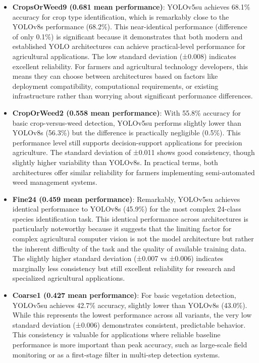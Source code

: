 \begin{itemize}
    \item \textbf{CropsOrWeed9 (0.681 mean performance)}: YOLOv5su achieves 68.1\% accuracy for crop type identification, which is remarkably close to the YOLOv8s performance (68.2\%). This near-identical performance (difference of only 0.1\%) is significant because it demonstrates that both modern and established YOLO architectures can achieve practical-level performance for agricultural applications. The low standard deviation (±0.008) indicates excellent reliability. For farmers and agricultural technology developers, this means they can choose between architectures based on factors like deployment compatibility, computational requirements, or existing infrastructure rather than worrying about significant performance differences.
    
    \item \textbf{CropOrWeed2 (0.558 mean performance)}: With 55.8\% accuracy for basic crop-versus-weed detection, YOLOv5su performs slightly lower than YOLOv8s (56.3\%) but the difference is practically negligible (0.5\%). This performance level still supports decision-support applications for precision agriculture. The standard deviation of ±0.011 shows good consistency, though slightly higher variability than YOLOv8s. In practical terms, both architectures offer similar reliability for farmers implementing semi-automated weed management systems.
    
    \item \textbf{Fine24 (0.459 mean performance)}: Remarkably, YOLOv5su achieves identical performance to YOLOv8s (45.9\%) for the most complex 24-class species identification task. This identical performance across architectures is particularly noteworthy because it suggests that the limiting factor for complex agricultural computer vision is not the model architecture but rather the inherent difficulty of the task and the quality of available training data. The slightly higher standard deviation (±0.007 vs ±0.006) indicates marginally less consistency but still excellent reliability for research and specialized agricultural applications.
    
    \item \textbf{Coarse1 (0.427 mean performance)}: For basic vegetation detection, YOLOv5su achieves 42.7\% accuracy, slightly lower than YOLOv8s (43.0\%). While this represents the lowest performance across all variants, the very low standard deviation (±0.006) demonstrates consistent, predictable behavior. This consistency is valuable for applications where reliable baseline performance is more important than peak accuracy, such as large-scale field monitoring or as a first-stage filter in multi-step detection systems.
\end{itemize}

